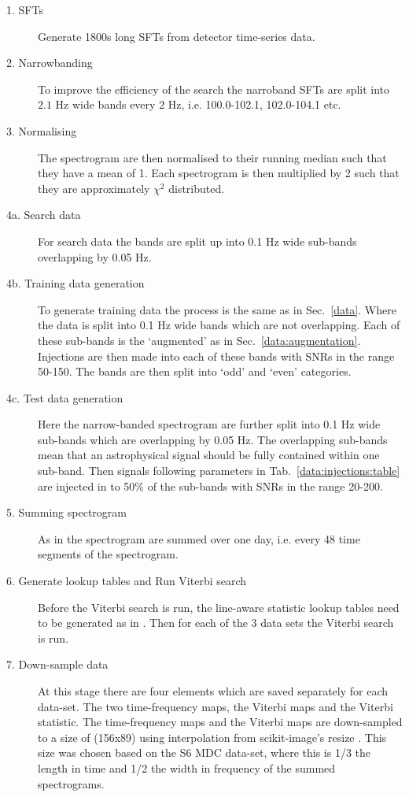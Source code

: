 \begin{description}
    \item[1. \acp{SFT}] Generate 1800s long \acp{SFT} from detector time-series data. 

    \item[2. Narrowbanding] To improve the efficiency of the search the
    narroband \acp{SFT} are split into $2.1$ Hz wide bands every $2$ Hz,
    i.e. 100.0-102.1, 102.0-104.1 etc.
    
    \item[3. Normalising] The spectrogram are then normalised to their running median such that they have a mean of 1. Each spectrogram is then multiplied by 2 such that they are approximately $\chi^{2}$ distributed.
    
    \item[4a. Search data] For search data the bands are split up into 0.1 Hz wide sub-bands overlapping by 0.05 Hz.

    \item[4b. Training data generation] To generate training data the
    process is the same as in Sec.~\ref{data}. Where the
    data is split into 0.1 Hz wide bands which are not
    overlapping. Each of these sub-bands is the `augmented' as in Sec.~\ref{data:augmentation}. Injections are then made into each of these bands with \acp{SNR} in the range 50-150. The bands are then split into `odd' and `even' categories.

    \item[4c. Test data generation] Here the narrow-banded
    spectrogram are further split into 0.1 Hz wide sub-bands which
    are overlapping by 0.05 Hz. The overlapping sub-bands mean that an
    astrophysical signal should be fully contained within one
    sub-band. Then signals following parameters in Tab.~\ref{data:injections:table} are injected in to 50\% of the sub-bands with \acp{SNR} in the range 20-200.

    \item[5. Summing spectrogram] As in \cite{Bayley2019GeneralizedSignals} the spectrogram are summed over one day, i.e. every 48 time segments of the spectrogram.
     
    \item[6. Generate lookup tables and Run Viterbi search] Before the Viterbi search is run, the line-aware statistic lookup tables need to be generated as in \cite{Bayley2019GeneralizedSignals}. Then for each of the 3 data sets the Viterbi search is run. 
     
    \item[7. Down-sample data] At this stage there are four elements which are saved separately for each data-set. The two time-frequency maps, the Viterbi maps and the Viterbi statistic. The time-frequency maps and the Viterbi maps are down-sampled to a size of (156x89) using interpolation from scikit-image's resize \cite{vanderWalt2014Scikit-image:Python}. This size was chosen based on the S6 \ac{MDC} data-set, where this is 1/3 the length in time and 1/2 the width in frequency of the summed spectrograms.



\end{description}
